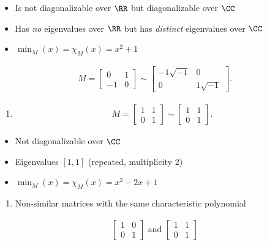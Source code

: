 \begin{itemize}
\item
  Is not diagonalizable over \(\RR\) but diagonalizable over \(\CC\)
\item
  Has \emph{no} eigenvalues over \(\RR\) but has \emph{distinct}
  eigenvalues over \(\CC\)
\item
  \(\min_M(x) = \chi_M(x) = x^2 + 1\)
\end{itemize}

\begin{align*}
M = \left[\begin{array}{rr}
0  & 1 \\
-1 & 0
\end{array}\right] \sim
\left[\begin{array}{r|r}
-1 \sqrt{-1} & 0 \\
\hline
0 & 1 \sqrt{-1}
\end{array}\right]
.\end{align*}

\begin{enumerate}
\def\labelenumi{\arabic{enumi}.}
\setcounter{enumi}{1}
\tightlist
\item
  \begin{align*}
  M = \left[\begin{array}{rr}
  1 & 1 \\
  0 & 1
  \end{array}\right] \sim
  \left[\begin{array}{rr}
  1 & 1 \\
  0 & 1
  \end{array}\right]
  .\end{align*}
\end{enumerate}

\begin{itemize}
\item
  Not diagonalizable over \(\CC\)
\item
  Eigenvalues \([1, 1]\) (repeated, multiplicity 2)
\item
  \(\min_M(x) = \chi_M(x) = x^2-2x+1\)
\end{itemize}

\begin{enumerate}
\def\labelenumi{\arabic{enumi}.}
\setcounter{enumi}{2}
\tightlist
\item
  Non-similar matrices with the same characteristic polynomial
\end{enumerate}

\begin{align*}
\left[\begin{array}{ll}
{1}  & {0} \\
{0} & {1}
 \end{array}\right]
 \text { and }
 \left[\begin{array}{ll}
 {1} & {1} \\
 {0} & {1}
  \end{array}\right]
\end{align*}

